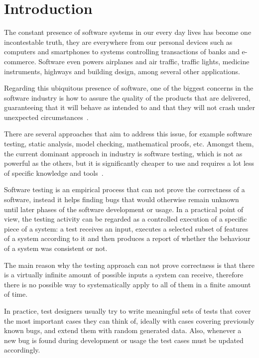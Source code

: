 \chapter{Introduction}

The constant presence of software systems in our every day lives has become one incontestable truth, they are everywhere from our personal devices such as computers and smartphones to systems controlling transactions of banks and e-commerce. Software even powers airplanes and air traffic, traffic lights, medicine instruments, highways and building design, among several other applications.

Regarding this ubiquitous presence of software, one of the biggest concerns in the software industry is how to assure the quality of the products that are delivered, guaranteeing that it will behave as intended to and that they will not crash under unexpected circumstances~\cite{Ammann2008}.

There are several approaches that aim to address this issue, for example software testing, static analysis, model checking, mathematical proofs, etc. Amongst them, the current dominant approach in industry is software testing, which is not as powerful as the others, but it is significantly cheaper to use and requires a lot less of specific knowledge and tools~\cite{Meyer2008, Utting2006}.

Software testing is an empirical process that can not prove the correctness of a software, instead it helps finding bugs that would otherwise remain unknown until later phases of the software development or usage. In a practical point of view, the testing activity can be regarded as a controlled execution of a specific piece of a system: a test receives an input, executes a selected subset of features of a system according to it and then produces a report of whether the behaviour of a system was consistent or not. 

The main reason why the testing approach can not prove correctness is that there is a virtually infinite amount of possible inputs a system can receive, therefore there is no possible way to systematically apply to all of them in a finite amount of time.

In practice, test designers usually try to write meaningful sets of tests that cover the most important cases they can think of, ideally with cases covering previously known bugs, and extend them with random generated data. Also, whenever a new bug is found during development or usage the test cases must be updated accordingly.

